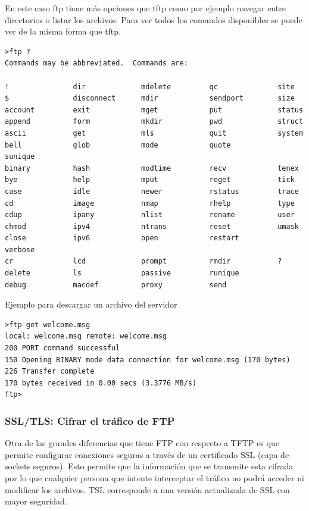 \documentclass[12pt]{article}
\begin{document}
En este caso ftp tiene más opciones que tftp como por ejemplo navegar entre directorios o listar los archivos. Para ver todos los comandos disponibles se puede ver de la misma forma que tftp.

\begin{lstlisting}[frame=single]
>ftp ?
Commands may be abbreviated.  Commands are:

!               dir             mdelete         qc              site
$               disconnect      mdir            sendport        size
account         exit            mget            put             status
append          form            mkdir           pwd             struct
ascii           get             mls             quit            system
bell            glob            mode            quote           sunique
binary          hash            modtime         recv            tenex
bye             help            mput            reget           tick
case            idle            newer           rstatus         trace
cd              image           nmap            rhelp           type
cdup            ipany           nlist           rename          user
chmod           ipv4            ntrans          reset           umask
close           ipv6            open            restart         verbose
cr              lcd             prompt          rmdir           ?
delete          ls              passive         runique
debug           macdef          proxy           send
\end{lstlisting}
\break
Ejemplo para descargar un archivo del servidor
\begin{lstlisting}[frame=single]
>ftp get welcome.msg
local: welcome.msg remote: welcome.msg
200 PORT command successful
150 Opening BINARY mode data connection for welcome.msg (170 bytes)
226 Transfer complete
170 bytes received in 0.00 secs (3.3776 MB/s)
ftp>
\end{lstlisting}


\subsubsection{SSL/TLS: Cifrar el tráfico de FTP}

Otra de las grandes diferencias que tiene FTP con respecto a TFTP es que permite configurar conexiones seguras a través de un certificado  SSL (capa de sockets seguros). Esto permite que la información que se transmite esta cifrada por lo que cualquier persona que intente interceptar el tráfico no podrá acceder ni modificar los archivos. TSL corresponde a una versión actualizada de SSL con mayor seguridad. 
\end{document}
